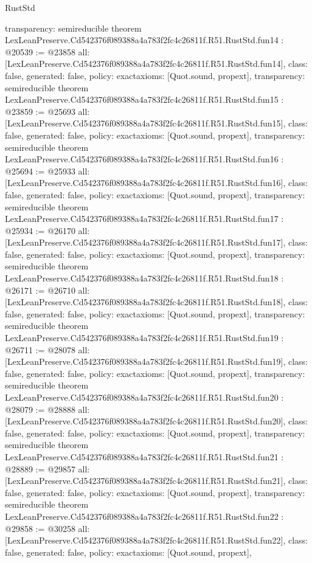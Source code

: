 \begin{lexlean}{RustStd}
\begin{coremodule}
{  transparency: semireducible
}
theorem LexLeanPreserve.Cd542376f089388a4a783f2fc4c26811f.R51.RustStd.fun14 : @20539 := @23858 {
  all: [LexLeanPreserve.Cd542376f089388a4a783f2fc4c26811f.R51.RustStd.fun14],
  class: false,
  generated: false,
  policy: exact{axioms: [Quot.sound, propext]},
  transparency: semireducible
}
theorem LexLeanPreserve.Cd542376f089388a4a783f2fc4c26811f.R51.RustStd.fun15 : @23859 := @25693 {
  all: [LexLeanPreserve.Cd542376f089388a4a783f2fc4c26811f.R51.RustStd.fun15],
  class: false,
  generated: false,
  policy: exact{axioms: [Quot.sound, propext]},
  transparency: semireducible
}
theorem LexLeanPreserve.Cd542376f089388a4a783f2fc4c26811f.R51.RustStd.fun16 : @25694 := @25933 {
  all: [LexLeanPreserve.Cd542376f089388a4a783f2fc4c26811f.R51.RustStd.fun16],
  class: false,
  generated: false,
  policy: exact{axioms: [Quot.sound, propext]},
  transparency: semireducible
}
theorem LexLeanPreserve.Cd542376f089388a4a783f2fc4c26811f.R51.RustStd.fun17 : @25934 := @26170 {
  all: [LexLeanPreserve.Cd542376f089388a4a783f2fc4c26811f.R51.RustStd.fun17],
  class: false,
  generated: false,
  policy: exact{axioms: [Quot.sound, propext]},
  transparency: semireducible
}
theorem LexLeanPreserve.Cd542376f089388a4a783f2fc4c26811f.R51.RustStd.fun18 : @26171 := @26710 {
  all: [LexLeanPreserve.Cd542376f089388a4a783f2fc4c26811f.R51.RustStd.fun18],
  class: false,
  generated: false,
  policy: exact{axioms: [Quot.sound, propext]},
  transparency: semireducible
}
theorem LexLeanPreserve.Cd542376f089388a4a783f2fc4c26811f.R51.RustStd.fun19 : @26711 := @28078 {
  all: [LexLeanPreserve.Cd542376f089388a4a783f2fc4c26811f.R51.RustStd.fun19],
  class: false,
  generated: false,
  policy: exact{axioms: [Quot.sound, propext]},
  transparency: semireducible
}
theorem LexLeanPreserve.Cd542376f089388a4a783f2fc4c26811f.R51.RustStd.fun20 : @28079 := @28888 {
  all: [LexLeanPreserve.Cd542376f089388a4a783f2fc4c26811f.R51.RustStd.fun20],
  class: false,
  generated: false,
  policy: exact{axioms: [Quot.sound, propext]},
  transparency: semireducible
}
theorem LexLeanPreserve.Cd542376f089388a4a783f2fc4c26811f.R51.RustStd.fun21 : @28889 := @29857 {
  all: [LexLeanPreserve.Cd542376f089388a4a783f2fc4c26811f.R51.RustStd.fun21],
  class: false,
  generated: false,
  policy: exact{axioms: [Quot.sound, propext]},
  transparency: semireducible
}
theorem LexLeanPreserve.Cd542376f089388a4a783f2fc4c26811f.R51.RustStd.fun22 : @29858 := @30258 {
  all: [LexLeanPreserve.Cd542376f089388a4a783f2fc4c26811f.R51.RustStd.fun22],
  class: false,
  generated: false,
  policy: exact{axioms: [Quot.sound, propext]},
}
\end{coremodule}
\end{lexlean}
